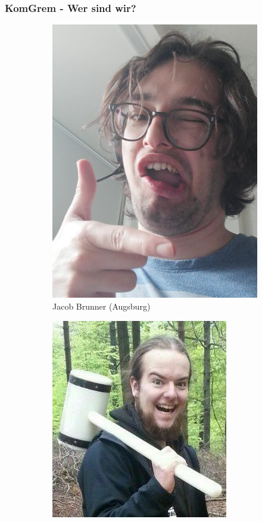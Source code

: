 \documentclass[compress, aspectratio=169]{beamer}
\begin{document}
\begin{frame}\frametitle{KomGrem - Wer sind wir?}

  \begin{figure}
     \begin{subfigure}[t]{0.24\textwidth}
       \includegraphics[height=.5\textheight]{brunner.jpg}
       \caption*{Jacob Brunner (Augsburg)}
     \end{subfigure}
       \begin{subfigure}[t]{0.24\textwidth}
         \includegraphics[height=.5\textheight]{blaensdorf.jpg}

\end{subfigure}
\end{figure}
\end{frame}
\end{document}

